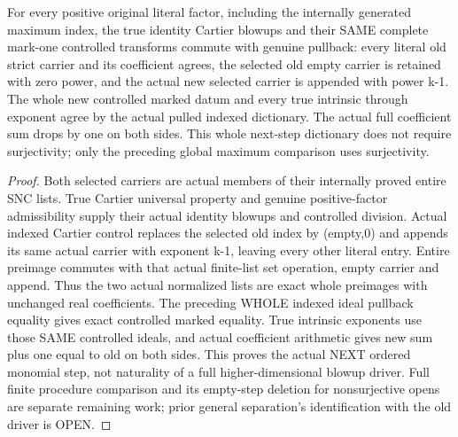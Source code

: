 \begin{theorem}
\label{hir:submersion-nc-actual-cartier-control}
\leanok
For every positive original literal factor, including the internally generated
maximum index, the true identity Cartier blowups and their SAME complete mark-one controlled transforms
commute with genuine pullback: every literal old strict carrier and its
coefficient agrees, the selected old empty carrier is retained with zero
power, and the actual new selected carrier is appended with power k-1.
The whole new controlled marked datum and every true intrinsic through
exponent agree by the actual pulled indexed dictionary. The actual full
coefficient sum drops by one on both sides. This whole next-step dictionary
does not require surjectivity; only the preceding global maximum comparison
uses surjectivity.
\end{theorem}
\begin{proof}
Both selected carriers are actual members of their internally proved entire
SNC lists. True Cartier universal property and genuine positive-factor
admissibility supply their actual identity blowups and controlled division.
Actual indexed Cartier control replaces the selected old index by (empty,0)
and appends its same actual carrier with exponent k-1, leaving every other
literal entry. Entire preimage commutes with that actual finite-list set
operation, empty carrier and append. Thus the two actual normalized lists
are exact whole preimages with unchanged real coefficients. The preceding
WHOLE indexed ideal pullback equality gives exact controlled marked equality.
True intrinsic exponents use those SAME controlled ideals, and actual
coefficient arithmetic gives new sum plus one equal to old on both sides.
This proves the actual NEXT ordered monomial step, not naturality of a full
higher-dimensional blowup driver. Full finite procedure comparison and its
empty-step deletion for nonsurjective opens are separate remaining work;
prior general separation's identification with the old driver is OPEN.
\end{proof}
